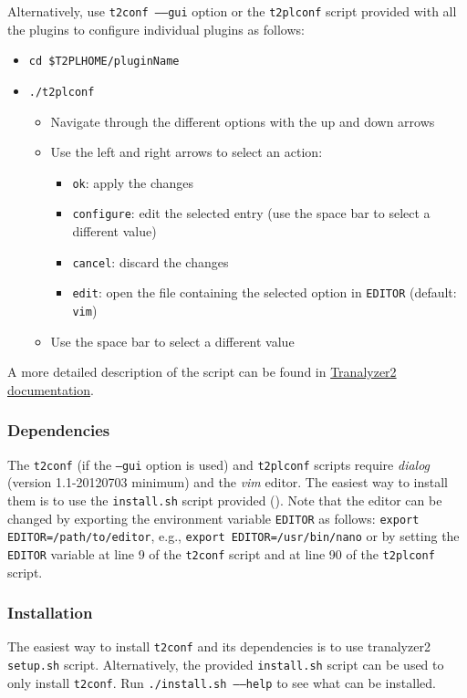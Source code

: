 \documentclass[documentation]{subfiles}
\begin{document}
Alternatively, use {\tt t2conf --{}--gui} option or the {\tt t2plconf} script provided with all the plugins to configure individual plugins as follows:

\begin{itemize}
    \item {\tt cd \$T2PLHOME/pluginName}
    \item {\tt ./t2plconf}
        \begin{itemize}
            \item Navigate through the different options with the up and down arrows
            \item Use the left and right arrows to select an action:
                \begin{itemize}
                    \item {\tt ok}: apply the changes
                    \item {\tt configure}: edit the selected entry (use the space bar to select a different value)
                    \item {\tt cancel}: discard the changes
                    \item {\tt edit}: open the file containing the selected option in {\tt EDITOR} (default: {\tt vim})
                \end{itemize}
            \item Use the space bar to select a different value
        \end{itemize}
\end{itemize}

A more detailed description of the script can be found in \href{../../tranalyzer2/doc/tranalyzer2.pdf}{Tranalyzer2 documentation}.

\subsubsection{Dependencies}
The {\tt t2conf} (if the {\tt --gui} option is used) and {\tt t2plconf} scripts require {\em dialog} (version 1.1-20120703 minimum) and the {\em vim} editor.
The easiest way to install them is to use the {\tt install.sh} script provided ().
Note that the editor can be changed by exporting the environment variable {\tt EDITOR} as follows: {\tt export EDITOR=/path/to/editor}, e.g., {\tt export EDITOR=/usr/bin/nano} or
by setting the {\tt EDITOR} variable at line 9 of the {\tt t2conf} script and at line 90 of the {\tt t2plconf} script.

\subsubsection{Installation}\label{t2confinstall}
The easiest way to install {\tt t2conf} and its dependencies is to use tranalyzer2 {\tt setup.sh} script.
Alternatively, the provided {\tt install.sh} script can be used to only install {\tt t2conf}.
Run {\tt ./install.sh --{}--help} to see what can be installed.
\end{document}
